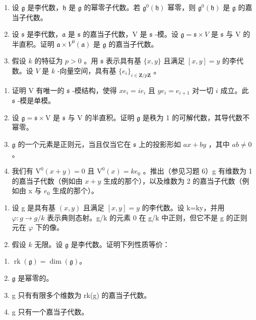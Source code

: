 \begin{enumerate}
\def\labelenumi{\arabic{enumi})}
\setcounter{enumi}{5}
\item
  设 \(\mathfrak{g}\) 是李代数，\(\mathfrak{h}\) 是 \(\mathfrak{g}\) 的幂零子代数。若 \(\mathfrak{g}^0 (\mathfrak{h})\) 幂零，则 \(\mathfrak{g}^0 (\mathfrak{h})\) 是 \(\mathfrak{g}\) 的嘉当子代数。
\item
  设 \(\mathfrak{s}\) 是李代数，\(\mathfrak{a}\) 是 \(\mathfrak{s}\) 的嘉当子代数，V 是 \(\mathfrak{s}\) -模。设 \(\mathfrak{g} = \mathfrak{s} \times V\) 是 \(\mathfrak{s}\) 与 V 的半直积。证明 \(\mathfrak{a} \times V^0(\mathfrak{a})\) 是 \(\mathfrak{g}\) 的嘉当子代数。
\item
  假设 \(k\) 的特征为 \(p > 0\) 。用 \(\mathfrak{s}\) 表示具有基 \(\{x, y\}\) 且满足 \([x, y] = y\) 的李代数。设 \(V\) 是 \(k\) -向量空间，具有基 \(\{e_i\}_{i \in \mathbf{Z}/p\mathbf{Z}}\) 。
\end{enumerate}

\begin{enumerate}
\def\labelenumi{\alph{enumi})}
\item
  证明 V 有唯一的 \(\mathfrak{s}\) -模结构，使得 \(xe_{i} = ie_{i}\) 且 \(ye_{i} = e_{i + 1}\) 对一切 \(i\) 成立。此 \(\mathfrak{s}\) -模是单模。
\item
  设 \(\mathfrak{g} = \mathfrak{s} \times \mathrm{V}\) 是 \(\mathfrak{s}\) 与 \(\mathrm{V}\) 的半直积。证明 \(\mathfrak{g}\) 是秩为 1 的可解代数，其导代数不幂零。
\item
  \(\mathfrak{g}\) 的一个元素是正则元，当且仅当它在 \(\mathfrak{s}\) 上的投影形如 \(ax + by\) ，其中 \(ab \neq 0\) 。
\item
  我们有 \(\mathrm{V}^{0}(x+y)=0\) 且 \(\mathrm{V}^{0}(x)=ke_{0}\) 。推出（参见习题 6）g 有维数为 1 的嘉当子代数（例如由 \(x+y\) 生成的那个），以及维数为 2 的嘉当子代数（例如由 x 与 \(e_{0}\) 生成的那个）。
\end{enumerate}

\begin{enumerate}
\def\labelenumi{\arabic{enumi})}
\setcounter{enumi}{8}
\item
  设 g 是具有基 \((x,y)\) 且满足 \([x,y]=y\) 的李代数。设 k=ky，并用 \(\varphi:g\to g/k\) 表示典则态射。g/k 的元素 0 在 g/k 中正则，但它不是 g 的正则元在 \(\varphi\) 下的像。
\item
  假设 \(k\) 无限。设 \(\mathfrak{g}\) 是李代数。证明下列性质等价：
\end{enumerate}

\begin{enumerate}
\def\labelenumi{(\roman{enumi})}
\item
  \(\operatorname{rk}(\mathfrak{g}) = \dim (\mathfrak{g})\)。
\item
  \(\mathfrak{g}\) 是幂零的。
\item
  g 只有有限多个维数为 rk(g) 的嘉当子代数。
\item
  g 只有一个嘉当子代数。
\end{enumerate}

